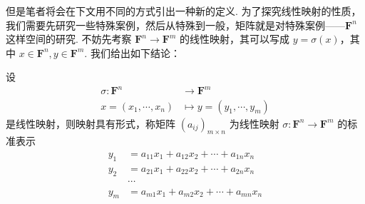但是笔者将会在下文用不同的方式引出一种新的定义. 为了探究线性映射的性质，我们需要先研究一些特殊案例，然后从特殊到一般，矩阵就是对特殊案例——$\mathbf{F}^n$ 这样空间的研究. 不妨先考察 $\mathbf{F}^n\to\mathbf{F}^m$ 的线性映射，其可以写成 $y = \sigma(x)$，其中 $x\in\mathbf{F}^n, y\in\mathbf{F}^m$. 我们给出如下结论：
\begin{lemma}{}{}
    设
    \begin{align*}
        \sigma \colon \mathbf{F}^n &\to \mathbf{F}^m \\
        x = (x_1, \cdots, x_n) & \mapsto y = (y_1, \cdots, y_m)
    \end{align*}
    是线性映射，则映射具有形式，称矩阵 $(a_{ij})_{m\times n}$ 为线性映射 $\sigma\colon\mathbf{F}^n\to\mathbf{F}^m$ 的标准表示
    \begin{align*}
        y_1 &= a_{11} x_1 + a_{12} x_2 + \cdots + a_{1n} x_n \\
        y_2 &= a_{21} x_1 + a_{22} x_2 + \cdots + a_{2n} x_n \\
        & \cdots\\
        y_m &= a_{m1} x_1 + a_{m2} x_2 + \cdots + a_{mn} x_n
    \end{align*}
\end{lemma}
